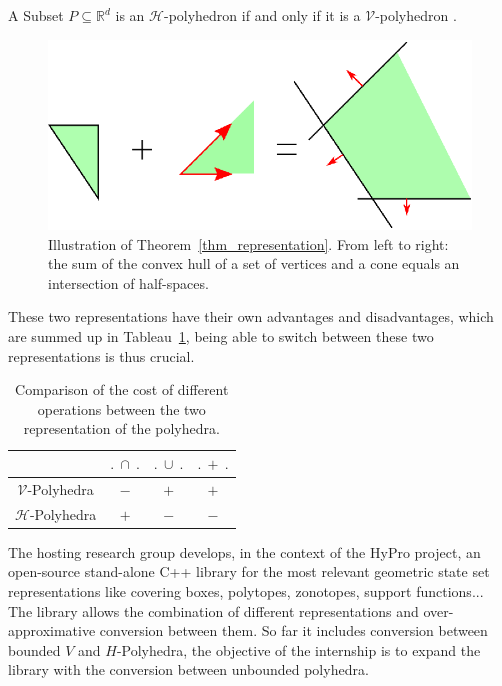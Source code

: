 \begin{theorem}
A Subset $P\subseteq\mathbb{R}^d$ is an $\mathcal{H}$-polyhedron if and only if it is a $\mathcal{V}$-polyhedron \cite{ziegler_polytopes}.
\label{thm_representation}
\end{theorem} 

\begin{figure}
\includegraphics[scale=1]{images/poly.eps}
\caption{Illustration of Theorem~\ref{thm_representation}. From left to right: the sum of the convex hull of a set of vertices and a cone equals an intersection of half-spaces.}
\end{figure}

These two representations have their own advantages and disadvantages, which are summed up  in Tableau~\ref{comparison tab}, being able to switch between these two representations is thus crucial.

\begin{table}
\begin{tabular}{| c | c | c | c |}
	\hline	
				    & $.\ \cap\ .$ & $.\ \cup\ .$ & $.\ +\ .$ \\ \hline
	$\mathcal{V}$-Polyhedra   & $-$ & $+$ & $+$ \\ \hline
   	$\mathcal{H}$-Polyhedra   & $+$ & $-$ & $-$\\ \hline
\end{tabular}
\caption{Comparison of the cost of different operations between the two representation of the polyhedra.}
\label{comparison tab}
\end{table}

The hosting research group develops, in the context of the HyPro project, an open-source stand-alone C++ library for the most relevant geometric state set representations like covering boxes, polytopes, zonotopes, support functions... 
The library allows the combination of different representations and over-approximative conversion between them. So far it includes conversion between bounded $V$ and $H$-Polyhedra, the objective of the internship is to expand the library with the conversion between unbounded polyhedra.


